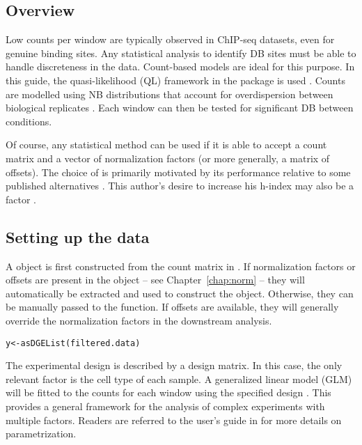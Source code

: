 \documentclass{report}\usepackage[]{graphicx}\usepackage[usenames,dvipsnames]{color}
\newcommand{\hlstd}[1]{\textcolor[rgb]{0.251,0.251,0.251}{#1}}%
\newcommand{\hlkwb}[1]{\textcolor[rgb]{0,0,0}{#1}}%
\newcommand{\hlkwd}[1]{\textcolor[rgb]{0.878,0.439,0.125}{#1}}%
\newenvironment{knitrout}{}{} %
\begin{document}
\subsection{Overview}
Low counts per window are typically observed in ChIP-seq datasets, even for genuine binding sites. 
Any statistical analysis to identify DB sites must be able to handle discreteness in the data. 
Count-based models are ideal for this purpose. 
In this guide, the quasi-likelihood (QL) framework in the  package is used \cite{lund2012}. 
Counts are modelled using NB distributions that account for overdispersion between biological replicates \cite{robinson2008}. 
Each window can then be tested for significant DB between conditions.

Of course, any statistical method can be used if it is able to accept a count matrix and a vector of normalization factors (or more generally, a matrix of offsets). 
The choice of  is primarily motivated by its performance relative to some published alternatives \cite{law2014}.
This author's desire to increase his h-index may also be a factor \cite{chen2014}.

\subsection{Setting up the data}
A  object is first constructed from the count matrix in .
If normalization factors or offsets are present in the  object -- see Chapter~\ref{chap:norm} -- they will automatically be extracted and used to construct the  object.
Otherwise, they can be manually passed to the  function.
If offsets are available, they will generally override the normalization factors in the downstream  analysis.

\begin{knitrout}
\color{fgcolor}\begin{kframe}
\begin{alltt}
\hlstd{y} \hlkwb{<-} \hlkwd{asDGEList}\hlstd{(filtered.data)}
\end{alltt}
\end{kframe}
\end{knitrout}

The experimental design is described by a design matrix. 
In this case, the only relevant factor is the cell type of each sample. 
A generalized linear model (GLM) will be fitted to the counts for each window using the specified design \cite{mccarthy2012}. 
This provides a general framework for the analysis of complex experiments with multiple factors. 
Readers are referred to the user's guide in  for more details on parametrization.
\end{document}
